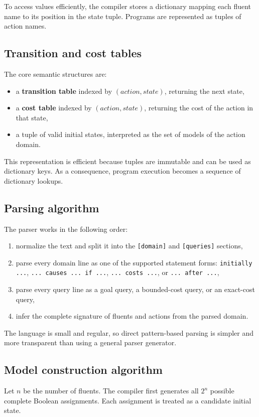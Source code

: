\documentclass[11pt]{article}
\begin{document}
To access values efficiently, the compiler stores a dictionary mapping each
fluent name to its position in the state tuple. Programs are represented as
tuples of action names.

\subsection{Transition and cost tables}
The core semantic structures are:
\begin{itemize}
    \item a \textbf{transition table} indexed by \((action, state)\), returning
    the next state,
    \item a \textbf{cost table} indexed by \((action, state)\), returning the
    cost of the action in that state,
    \item a tuple of valid initial states, interpreted as the set of models of
    the action domain.
\end{itemize}

This representation is efficient because tuples are immutable and can be used
as dictionary keys. As a consequence, program execution becomes a sequence of
dictionary lookups.

\subsection{Parsing algorithm}
The parser works in the following order:
\begin{enumerate}
    \item normalize the text and split it into the \texttt{[domain]} and
    \texttt{[queries]} sections,
    \item parse every domain line as one of the supported statement forms:
    \texttt{initially ...}, \texttt{... causes ... if ...},
    \texttt{... costs ...}, or \texttt{... after ...},
    \item parse every query line as a goal query, a bounded-cost query,
    or an exact-cost query,
    \item infer the complete signature of fluents and actions from the parsed domain.
\end{enumerate}

The language is small and regular, so direct pattern-based parsing is simpler
and more transparent than using a general parser generator.

\subsection{Model construction algorithm}
Let \(n\) be the number of fluents. The compiler first generates all \(2^n\)
possible complete Boolean assignments. Each assignment is treated as a candidate
initial state.
\end{document}
